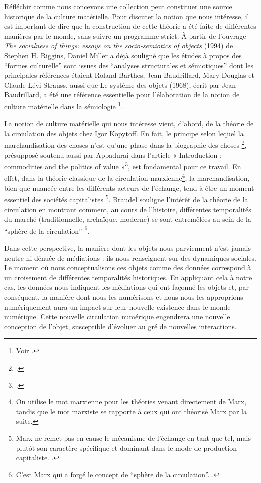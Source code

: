         Réfléchir comme nous concevons une collection peut constituer une source historique de la culture matérielle. Pour discuter la notion que nous intéresse, il est important de dire que la construction de cette théorie a été faite de différentes manières par le monde, sans suivre un programme strict. À partir de l’ouvrage \textit{The socialness of things: essays on the socio-semiotics of objects} (1994) de Stephen H. Riggins, Daniel Miller a déjà souligné que les études à propos des \enquote{formes culturelle} sont issues des \enquote{analyses structurales et sémiotiques} dont les principales références étaient Roland Barthes, Jean Baudrillard, Mary Douglas et Claude Lévi-Strauss, aussi que Le système des objets (1968), écrit par Jean Baudrillard, a été une référence essentielle pour l’élaboration de la notion de culture matérielle dans la sémiologie \footnote{Voir \cite{martin1996, miller1988, moxey2008, rede2001}.}.

        La notion de culture matérielle qui nous intéresse vient, d’abord, de la théorie de la circulation des objets chez Igor Kopytoff. En fait, le principe selon lequel la marchandisation des choses n’est qu’une phase dans la biographie des choses \footnote{\cite[p.~83]{kopytoff1986}.}, présupposé soutenu aussi par Appadurai dans l’article « Introduction : commodities and the politics of value »\footnote{\cite[p.~16-17]{appadurai1986}.}, est fondamental pour ce travail. En effet, dans la théorie classique de la circulation marxienne\footnote{On utilise le mot marxienne pour les théories venant directement de Marx, tandis que le mot marxiste se rapporte à ceux qui ont théorisé Marx par la suite.}, la marchandisation, bien que nuancée entre les différents acteurs de l’échange, tend à être un moment essentiel des sociétés capitalistes \footnote{Marx ne remet pas en cause le mécanisme de l'échange en tant que tel, mais plutôt son caractère spécifique et dominant dans le mode de production capitaliste. \cite[p.~10]{marx2008}.}. Braudel souligne l’intérêt de la théorie de la circulation en montrant comment, au cours de l’histoire, différentes temporalités du marché (traditionnelle, archaïque, moderne) se sont entremêlées au sein de la \enquote{sphère de la circulation} \footnote{C'est Marx qui a forgé le concept de \enquote{sphère de la circulation}. \cite[p.~11-12]{braudel1967}.}.

        Dans cette perspective, la manière dont les objets nous parviennent n'est jamais neutre ni dénuée de médiations : ils nous renseignent sur des dynamiques sociales. Le moment où nous conceptualisons ces objets comme des données correspond à un croisement de différentes temporalités historiques. En appliquant cela à notre cas, les données nous indiquent les médiations qui ont façonné les objets et, par conséquent, la manière dont nous les numérisons et nous nous les approprions numériquement aura un impact sur leur nouvelle existence dans le monde numérique. Cette nouvelle circulation numérique engendrera une nouvelle conception de l'objet, susceptible d'évoluer au gré de nouvelles interactions.

